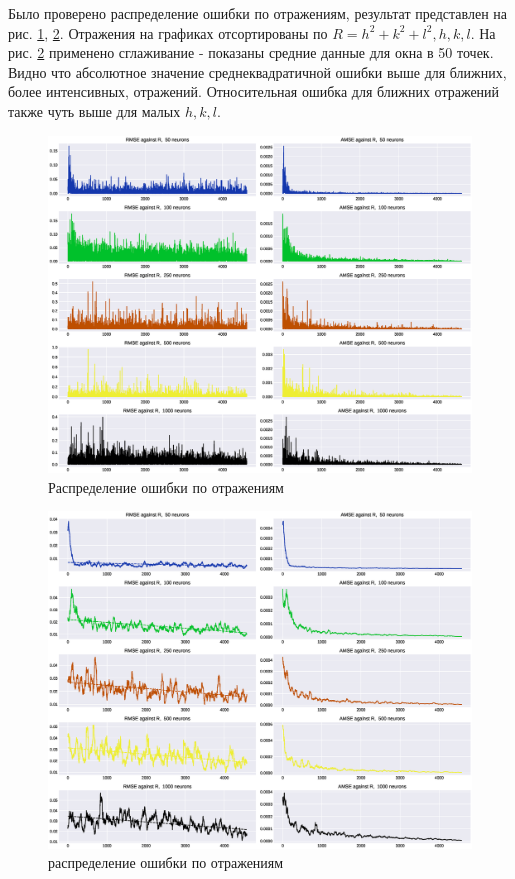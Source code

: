 \documentclass{article}
\begin{document}
Было проверено распределение ошибки по отражениям, результат представлен на рис. \ref{fig:aenc_errdist}, \ref{fig:aenc_errdist_fl}. Отражения на графиках отсортированы по $R=h^2+ k^2 + l^2, h,k,l$. На рис. \ref{fig:aenc_errdist_fl} применено сглаживание - показаны средние данные для окна в 50 точек. Видно что абсолютное значение среднеквадратичной ошибки выше для ближних, более интенсивных, отражений. Относительная ошибка для ближних отражений также чуть выше для малых $h,k,l$.

\begin{figure}[htp]
\centering
\includegraphics[width=\linewidth]{imgs/aenc-errdist.eps}
\caption{Распределение ошибки по отражениям}
\label{fig:aenc_errdist}
\end{figure}


\begin{figure}[htp]
\centering
\includegraphics[scale=0.50]{imgs/aenc-errdist_fl.eps}
\caption{распределение ошибки по отражениям}
\label{fig:aenc_errdist_fl}
\end{figure}
\end{document}
